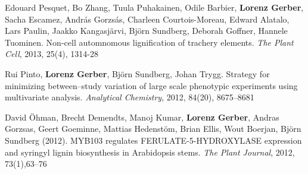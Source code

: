 \documentclass[10pt]{article}
\begin{document}
\begin{bibenum}
                                                                                           \item Edouard Pesquet, Bo Zhang, Tuula Puhakainen, Odile Barbier,
                                                                                             \textbf{Lorenz Gerber}, Sacha Escamez, Andr\'{a}s Gorzs\'{a}s,
                                                                                             Charleen Courtois-Moreau, Edward Alatalo, Lars Paulin,
                                                                                             Jaakko Kangasj\"arvi, Bj\"{o}rn Sundberg, Deborah Goffner,
                                                                                             Hannele Tuominen. Non-cell automnomous lignification of
                                                                                             trachery elements. \textit{The Plant Cell}, 2013, 25(4), 1314-28\\


                                                                                           \item Rui Pinto, \textbf{Lorenz Gerber}, Bj\"{o}rn Sundberg,
                                                                                             Johan Trygg. Strategy for minimizing between--study variation of large
                                                                                             scale phenotypic experiments using multivariate analysis.
                                                                                             \emph{Analytical Chemistry}, 2012, 84(20), 8675--8681\\


                                                                                           \item David \"{O}hman, Brecht Demendts, Manoj Kumar,
                                                                                             \textbf{Lorenz Gerber}, Andras Gorzsas, Geert Goeminne,
                                                                                             Mattias Hedenst\"{o}m, Brian Ellis, Wout Boerjan, Bj\"{o}rn Sundberg (2012).
                                                                                             MYB103 regulates FERULATE-5-HYDROXYLASE expression and
                                                                                             syringyl lignin biosynthesis in Arabidopsis stems.
                                                                                             \emph{The Plant Journal}, 2012, 73(1),63--76\\



\end{bibenum}
\end{document}
